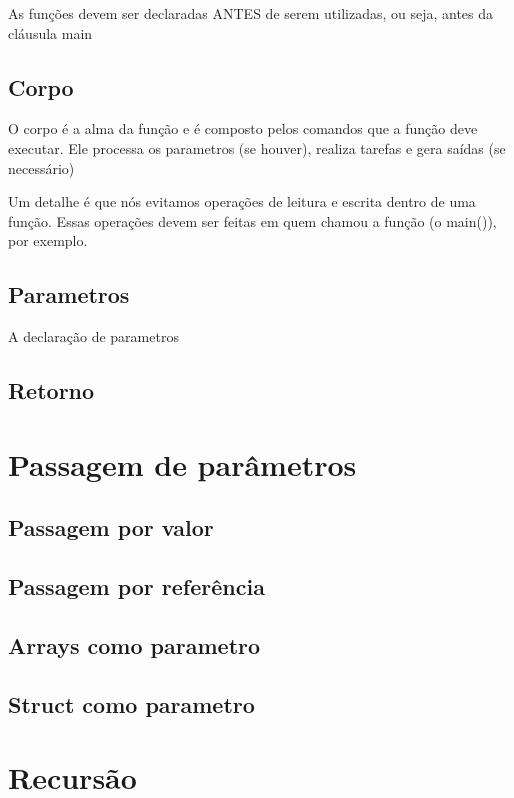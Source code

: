 \documentclass{report}
\begin{document}
	As funções devem ser declaradas ANTES de serem utilizadas, ou seja, antes da cláusula main
	
	\subsection{Corpo}
	
	O corpo é a alma da função e é composto pelos comandos que a função deve executar. Ele processa os parametros (se houver), realiza tarefas e gera saídas (se necessário)
	
	Um detalhe é que nós evitamos operações de leitura e escrita dentro de uma função. Essas operações devem ser feitas em quem chamou a função (o main()), por exemplo.
	
	\subsection{Parametros}
	
	A declaração de parametros
	
	\subsection{Retorno}
	

	

	

	
	
	
	
	
	\section{Passagem de parâmetros}
	\subsection{Passagem por valor}
	\subsection{Passagem por referência}
	\subsection{Arrays como parametro}
	\subsection{Struct como parametro}
	
	\section{Recursão}
	
\end{document}

